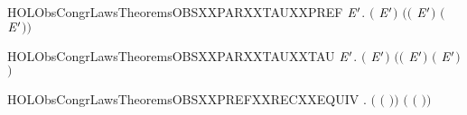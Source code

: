 \newcommand{\HOLObsCongrLawsTheoremsOBSXXPARXXPREFXXTAU}{\UseVerbatim{HOLObsCongrLawsTheoremsOBSXXPARXXPREFXXTAU}}
\begin{SaveVerbatim}{HOLObsCongrLawsTheoremsOBSXXPARXXTAUXXPREF}
\HOLTokenTurnstile{} \HOLSymConst{\HOLTokenForall{}}  \ensuremath{\HOLBoundVar{E}\sp{\prime}}.  \ensuremath{(}\HOLConst{\ensuremath{\tau}}\HOLSymConst{\ensuremath{\ldotp}} \HOLSymConst{\ensuremath{\mid}} \HOLSymConst{\ensuremath{\ldotp}}\ensuremath{\HOLBoundVar{E}\sp{\prime}}\ensuremath{)} \ensuremath{(}\HOLConst{\ensuremath{\tau}}\HOLSymConst{\ensuremath{\ldotp}}\ensuremath{(} \HOLSymConst{\ensuremath{\mid}} \HOLSymConst{\ensuremath{\ldotp}}\ensuremath{\HOLBoundVar{E}\sp{\prime}}\ensuremath{)} \HOLSymConst{\ensuremath{+}} \HOLSymConst{\ensuremath{\ldotp}}\ensuremath{(}\HOLConst{\ensuremath{\tau}}\HOLSymConst{\ensuremath{\ldotp}} \HOLSymConst{\ensuremath{\mid}} \ensuremath{\HOLBoundVar{E}\sp{\prime}}\ensuremath{)}\ensuremath{)}
\end{SaveVerbatim}
\newcommand{\HOLObsCongrLawsTheoremsOBSXXPARXXTAUXXPREF}{\UseVerbatim{HOLObsCongrLawsTheoremsOBSXXPARXXTAUXXPREF}}
\begin{SaveVerbatim}{HOLObsCongrLawsTheoremsOBSXXPARXXTAUXXTAU}
\HOLTokenTurnstile{} \HOLSymConst{\HOLTokenForall{}} \ensuremath{\HOLBoundVar{E}\sp{\prime}}.  \ensuremath{(}\HOLConst{\ensuremath{\tau}}\HOLSymConst{\ensuremath{\ldotp}} \HOLSymConst{\ensuremath{\mid}} \HOLConst{\ensuremath{\tau}}\HOLSymConst{\ensuremath{\ldotp}}\ensuremath{\HOLBoundVar{E}\sp{\prime}}\ensuremath{)} \ensuremath{(}\HOLConst{\ensuremath{\tau}}\HOLSymConst{\ensuremath{\ldotp}}\ensuremath{(} \HOLSymConst{\ensuremath{\mid}} \HOLConst{\ensuremath{\tau}}\HOLSymConst{\ensuremath{\ldotp}}\ensuremath{\HOLBoundVar{E}\sp{\prime}}\ensuremath{)} \HOLSymConst{\ensuremath{+}} \HOLConst{\ensuremath{\tau}}\HOLSymConst{\ensuremath{\ldotp}}\ensuremath{(}\HOLConst{\ensuremath{\tau}}\HOLSymConst{\ensuremath{\ldotp}} \HOLSymConst{\ensuremath{\mid}} \ensuremath{\HOLBoundVar{E}\sp{\prime}}\ensuremath{)}\ensuremath{)}
\end{SaveVerbatim}
\newcommand{\HOLObsCongrLawsTheoremsOBSXXPARXXTAUXXTAU}{\UseVerbatim{HOLObsCongrLawsTheoremsOBSXXPARXXTAUXXTAU}}
\begin{SaveVerbatim}{HOLObsCongrLawsTheoremsOBSXXPREFXXRECXXEQUIV}
\HOLTokenTurnstile{} \HOLSymConst{\HOLTokenForall{}}  .  \ensuremath{(}\HOLSymConst{\ensuremath{\ldotp}}  \ensuremath{(}\HOLSymConst{\ensuremath{\ldotp}}\HOLSymConst{\ensuremath{\ldotp}} \ensuremath{)}\ensuremath{)} \ensuremath{(}  \ensuremath{(}\HOLSymConst{\ensuremath{\ldotp}}\HOLSymConst{\ensuremath{\ldotp}} \ensuremath{)}\ensuremath{)}
\end{SaveVerbatim}
